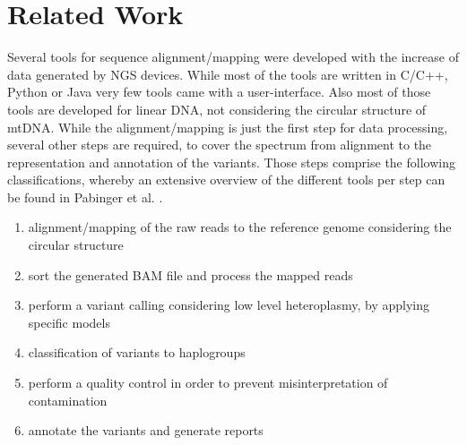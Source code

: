 \section{Related Work}
Several tools for sequence alignment/mapping were developed with the increase of data generated by NGS devices. While most of the tools are written in C/C++, Python or Java very few tools came with a user-interface. Also most of those tools are developed for linear DNA, not considering the circular structure of mtDNA. While the alignment/mapping is just the first step for data processing, several other steps are required, to cover the spectrum from alignment to the representation and annotation of the variants. Those steps comprise the following classifications, whereby an extensive overview of the different tools per step can be found in Pabinger et al. \cite{Pabinger2013}. 
\begin{enumerate}\label{enum:NGS}
\item alignment/mapping of the raw reads to the reference genome considering the circular structure
\item sort the generated BAM file and process the mapped reads
\item perform a variant calling considering low level heteroplasmy, by applying specific models
\item classification of variants to haplogroups
\item perform a quality control in order to prevent misinterpretation of contamination 
\item annotate the variants and generate reports
\end{enumerate}

